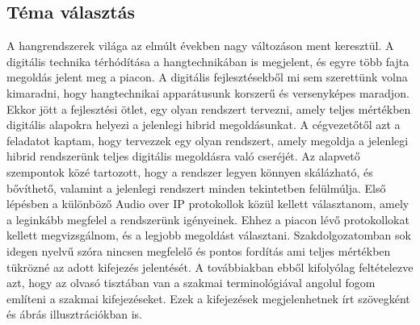 \subsection{Téma választás}

A hangrendszerek világa az elmúlt években nagy változáson ment keresztül. A digitális technika térhódítása a hangtechnikában is megjelent, és egyre több fajta megoldás jelent meg a piacon.
A digitális fejlesztésekből mi sem szerettünk volna kimaradni, hogy hangtechnikai apparátusunk korszerű és versenyképes maradjon.
Ekkor jött a fejlesztési ötlet, egy olyan rendszert tervezni, amely teljes mértékben digitális alapokra helyezi a jelenlegi hibrid megoldásunkat. A cégvezetőtől azt a feladatot kaptam,
hogy tervezzek egy olyan rendszert, amely megoldja a jelenlegi hibrid rendszerünk teljes digitális megoldásra való cseréjét. 
Az alapvető szempontok közé tartozott, hogy a rendszer legyen könnyen skálázható, és bővíthető, valamint a jelenlegi rendszert minden tekintetben felülmúlja.
Első lépésben a különböző Audio over IP protokollok közül kellett választanom,
amely a leginkább megfelel a rendszerünk igényeinek. Ehhez a piacon lévő protokollokat kellett megvizsgálnom, és a legjobb megoldást választani. 
Szakdolgozatomban sok idegen nyelvű szóra nincsen megfelelő és pontos fordítás ami teljes mértékben tükrözné az adott kifejezés jelentését.
A továbbiakban ebből kifolyólag feltételezve azt, hogy az olvasó tisztában van a szakmai terminológiával angolul fogom említeni a szakmai kifejezéseket.
Ezek a kifejezések megjelenhetnek írt szövegként és ábrás illusztrációkban is.
